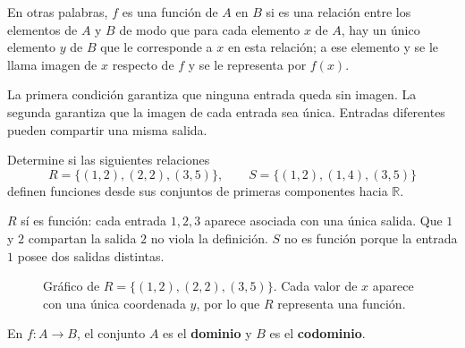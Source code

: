 \begin{nota}
En otras palabras, $f$ es una función de $A$ en $B$ si es una relación entre los
elementos de $A$ y $B$ de modo que para cada elemento $x$ de $A$, hay un único
elemento $y$ de $B$ que le corresponde a $x$ en esta relación; a ese elemento y
se le llama imagen de $x$ respecto de $f$ y se le representa por $f(x)$.
\end{nota}

La primera condición garantiza que ninguna entrada queda sin imagen. La segunda garantiza que la imagen de cada entrada sea única. Entradas diferentes pueden compartir una misma salida.

\begin{ejemplo}
Determine si las siguientes relaciones 
\[
R=\{(1,2),(2,2),(3,5)\},\qquad
S=\{(1,2),(1,4),(3,5)\}
\]
definen funciones desde sus conjuntos de primeras componentes hacia $\mathbb{R}$.
\end{ejemplo}
\ifmostrarSoluciones
\begin{solucion}
$R$ sí es función: cada entrada $1,2,3$ aparece asociada con una única salida. Que $1$ y $2$ compartan la salida $2$ no viola la definición. $S$ no es función porque la entrada $1$ posee dos salidas distintas.
\end{solucion}
\else\vspace{12mm}\fi

\begin{figure}[H]
\centering
{}
\caption{Gráfico de $R=\{(1,2),(2,2),(3,5)\}$. Cada valor de $x$ aparece con una única coordenada $y$, por lo que $R$ representa una función.}
\label{fig:pares-ordenados-funcion}
\end{figure}

\begin{definicion}
En $f:A\to B$, el conjunto $A$ es el \textbf{dominio} y $B$ es el \textbf{codominio}.
\end{definicion}

